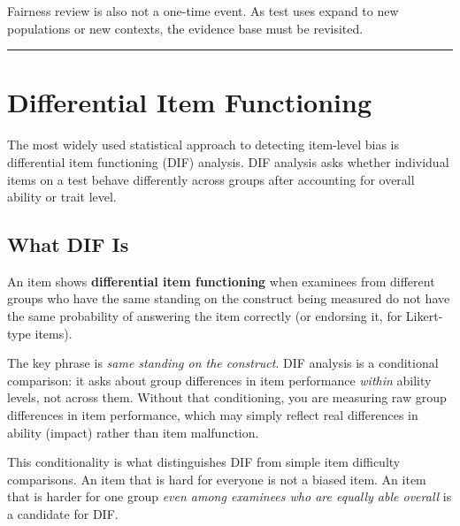 \documentclass[
  11pt,
  letterpaper,
]{scrbook}
\begin{document}
Fairness review is also not a one-time event. As test uses expand to new
populations or new contexts, the evidence base must be revisited.

\begin{center}\rule{0.5\linewidth}{0.5pt}\end{center}

\section{Differential Item
Functioning}\label{differential-item-functioning}

The most widely used statistical approach to detecting item-level bias
is differential item functioning (DIF) analysis. DIF analysis asks
whether individual items on a test behave differently across groups
after accounting for overall ability or trait level.

\subsection{What DIF Is}\label{what-dif-is}

\begin{tcolorbox}[enhanced jigsaw, colback=white, toprule=.15mm, colbacktitle=quarto-callout-note-color!10!white, left=2mm, leftrule=.75mm, opacitybacktitle=0.6, colframe=quarto-callout-note-color-frame, rightrule=.15mm, bottomtitle=1mm, opacityback=0, titlerule=0mm, toptitle=1mm, breakable, bottomrule=.15mm, coltitle=black, title=\textcolor{quarto-callout-note-color}{\faInfo}\hspace{0.5em}{Note}, arc=.35mm]

An item shows \textbf{differential item functioning} when examinees from
different groups who have the same standing on the construct being
measured do not have the same probability of answering the item
correctly (or endorsing it, for Likert-type items).

\end{tcolorbox}

The key phrase is \emph{same standing on the construct}. DIF analysis is
a conditional comparison: it asks about group differences in item
performance \emph{within} ability levels, not across them. Without that
conditioning, you are measuring raw group differences in item
performance, which may simply reflect real differences in ability
(impact) rather than item malfunction.

This conditionality is what distinguishes DIF from simple item
difficulty comparisons. An item that is hard for everyone is not a
biased item. An item that is harder for one group \emph{even among
examinees who are equally able overall} is a candidate for DIF.
\end{document}
